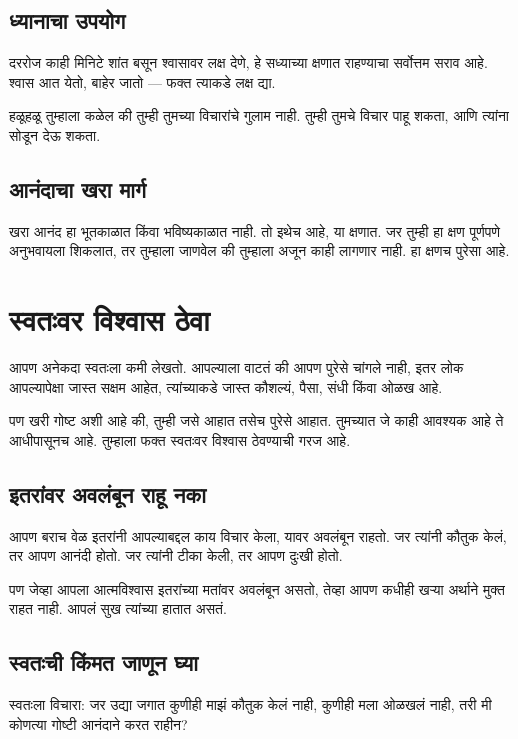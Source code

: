 \section*{ध्यानाचा उपयोग}
दररोज काही मिनिटे शांत बसून श्वासावर लक्ष देणे, 
हे सध्याच्या क्षणात राहण्याचा सर्वोत्तम सराव आहे. 
श्वास आत येतो, बाहेर जातो — 
फक्त त्याकडे लक्ष द्या. 

हळूहळू तुम्हाला कळेल की तुम्ही तुमच्या विचारांचे गुलाम नाही. 
तुम्ही तुमचे विचार पाहू शकता, 
आणि त्यांना सोडून देऊ शकता. 

\section*{आनंदाचा खरा मार्ग}
खरा आनंद हा भूतकाळात किंवा भविष्यकाळात नाही. 
तो इथेच आहे, या क्षणात. 
जर तुम्ही हा क्षण पूर्णपणे अनुभवायला शिकलात, 
तर तुम्हाला जाणवेल की तुम्हाला अजून काही लागणार नाही. 
हा क्षणच पुरेसा आहे. 



\chapter{स्वतःवर विश्वास ठेवा}

आपण अनेकदा स्वतःला कमी लेखतो. 
आपल्याला वाटतं की आपण पुरेसे चांगले नाही, 
इतर लोक आपल्यापेक्षा जास्त सक्षम आहेत, 
त्यांच्याकडे जास्त कौशल्यं, पैसा, संधी किंवा ओळख आहे. 

पण खरी गोष्ट अशी आहे की, 
तुम्ही जसे आहात तसेच पुरेसे आहात. 
तुमच्यात जे काही आवश्यक आहे ते आधीपासूनच आहे. 
तुम्हाला फक्त स्वतःवर विश्वास ठेवण्याची गरज आहे. 

\section*{इतरांवर अवलंबून राहू नका}
आपण बराच वेळ इतरांनी आपल्याबद्दल काय विचार केला, 
यावर अवलंबून राहतो. 
जर त्यांनी कौतुक केलं, तर आपण आनंदी होतो. 
जर त्यांनी टीका केली, तर आपण दुःखी होतो. 

पण जेव्हा आपला आत्मविश्वास इतरांच्या मतांवर अवलंबून असतो, 
तेव्हा आपण कधीही खऱ्या अर्थाने मुक्त राहत नाही. 
आपलं सुख त्यांच्या हातात असतं. 

\section*{स्वतःची किंमत जाणून घ्या}
स्वतःला विचारा: 
जर उद्या जगात कुणीही माझं कौतुक केलं नाही, 
कुणीही मला ओळखलं नाही, 
तरी मी कोणत्या गोष्टी आनंदाने करत राहीन? 

